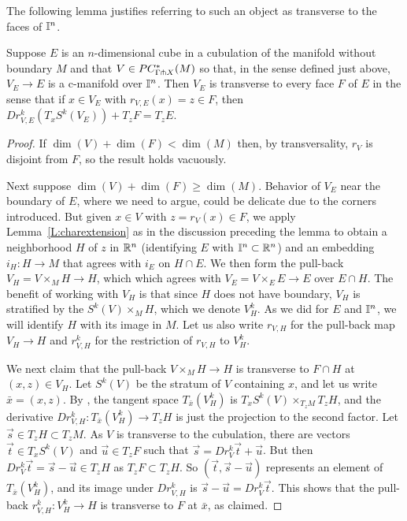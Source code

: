 The following lemma justifies referring to such an object as transverse to the faces of $\mathbb{I}^n$.

\begin{lemma}\label{L:complement}
	Suppose $E$ is an $n$-dimensional cube in a cubulation of the manifold without boundary $M$ and that $V \in PC^*_{\Gamma \pitchfork X}(M)$ so that, in the sense defined just above, $V_E \to E$ is a c-manifold over $\mathbb{I}^n$.
	Then $V_E$ is transverse to every face $F$ of $E$ in the sense that if $x \in V_E$ with $r_{V,E}(x) = z \in F$, then $Dr_{V,E}^k(T_xS^k(V_E)) + T_zF = T_zE$.
\end{lemma}


\begin{proof}
	If $\dim(V) + \dim(F) < \dim(M)$ then, by  transversality,  $r_V$ is disjoint from $F$, so the result holds vacuously.

	Next suppose $\dim(V) + \dim(F) \geq \dim(M)$.
	Behavior of $V_E$ near the boundary of $E$, where we need to argue, could be delicate due to the corners introduced.
	But given $x \in V$ with $z = r_V(x) \in F$, we apply Lemma~\ref{L:charextension} as in the discussion preceding the lemma to obtain a neighborhood $H$ of $z$ in $\mathbb{R}^n$ (identifying $E$ with $\mathbb{I}^n \subset \mathbb{R}^n$) and an embedding $i_H \colon H \to M$ that agrees with $i_E$ on $H \cap E$.
	We then form the pull-back $V_H = V \times_M H \to H$, which which agrees with $V_E = V \times_E E \to E$ over $E \cap H$.
	The benefit of working with $V_H$ is that since $H$ does not have boundary, $V_H$ is stratified by the $S^k(V) \times_M H$, which we denote $V_H^k$.
	As we did for $E$ and $\mathbb{I}^n$, we will identify $H$ with its image in $M$.
	Let us also write $r_{V,H}$ for the pull-back map $V_H \to H$ and $r_{V,H}^k$ for the restriction of $r_{V,H}$ to $V_H^k$.

	We next claim that the pull-back $V \times_M H \to H$ is transverse to $F \cap H$ at $(x,z) \in V_H$.
	Let $S^k(V)$ be the stratum of $V$ containing $x$, and let us write $\bar{x} = (x,z)$.
	By \cite[Lemma 2.28 and Corollary 2.29]{medina2022foundations}, the tangent space $T_{\bar{x}}(V^k_H)$ is $T_xS^k(V) \times_{T_zM} T_zH$, and the derivative $Dr_{V,H}^k \colon T_{\bar{x}}(V^k_H) \to T_zH$ is just the projection to the second factor.
	Let $\vec s \in T_zH \subset T_z M$.
	As $V$ is transverse to the cubulation, there are vectors $\vec t \in T_xS^k(V)$ and $\vec u \in T_zF$ such that $\vec s = Dr^k_V \vec t + \vec u$.
	But then $Dr^k_V\vec t = \vec s - \vec u \in T_zH$ as $T_zF \subset T_zH$.
	So $(\vec t, \vec s - \vec u)$ represents an element of $T_{\bar{x}}(V^k_H)$, and its image under $Dr_{V,H}^k$ is $\vec s - \vec u = Dr^k_V\vec t$.
	This shows that the pull-back $r^k_{V,H} \colon V^k_H \to H$ is transverse to $F$ at $\bar{x}$, as claimed.
\end{proof}







